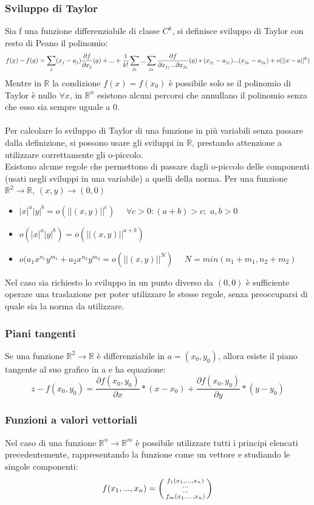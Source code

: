 \documentclass{article}
\newcommand\ubar[1]{\stackunder[1.2pt]{$#1$}{\rule{.8ex}{.075ex}}}
\newcommand{\R}{\mathds{R}}
\begin{document}
\subsubsection{Sviluppo di Taylor}
Sia f una funzione differenziabile di classe $C^k$, si definisce sviluppo di Taylor con resto di Peano il polinomio:
$$f(\ubar{x})-f(\ubar{a})=\sum_j(x_j-a_j)\frac{\partial f}{\partial x_j}(\ubar{a})+...+ \frac{1}{k!}\sum_{j_1}...\sum_{j_k}\frac{\partial f}{\partial x_{j_1}...\partial x_{j_k}}(\ubar{a})*(x_{j_1}-a_{j_1})...(x_{j_k}-a_{j_k})\\+o(||x-a||^k)$$
Mentre in $\R$ la condizione $f(x)=f(x_0)$ è possibile solo se il polinomio di Taylor è nullo $\forall x$, in $\R^n$ esistono alcuni percorsi che annullano il polinomio senza che esso sia sempre uguale a 0.\\\\
Per calcolare lo sviluppo di Taylor di una funzione in più variabili senza passare dalla definizione, si possono usare gli sviluppi in $\R$, prestando attenzione a utilizzare correttamente gli o-piccolo.\\
Esistono alcune regole che permettono di passare dagli o-piccolo delle componenti (usati negli sviluppi in una variabile) a quelli della norma. Per una funzione $\R^2\rightarrow\R$, $(x,y)\rightarrow(0,0)$
\begin{itemize}
    \item $|x|^a|y|^b=o(||(x,y)||^c)$ $\quad \forall c>0: (a+b)>c;$ $a,b>0$
    \item $o(|x|^a|y|^b)=o(||(x,y)||^{a+b})$
    \item $o(a_1x^{n_1}y^{m_1}+a_2x^{n_2}y^{m_2}=o(||(x,y)||^N)$ $\quad N=min(n_1+m_1,n_2+m_2)$
\end{itemize}
Nel caso sia richiesto lo sviluppo in un punto diverso da $(0,0)$ è sufficiente operare una traslazione per poter utilizzare le stesse regole, senza preoccuparsi di quale sia la norma da utilizzare.


\subsubsection{Piani tangenti}
Se una funzione $\R^2\rightarrow\R$ è differenziabile in $a=(x_0,y_0)$, allora esiste il piano tangente al suo grafico in a e ha equazione:
$$ z-f(x_0,y_0)=\frac{\partial f(x_0,y_0)}{\partial x}*(x-x_0)+\frac{\partial f(x_0,y_0)}{\partial y}*(y-y_0) $$


\subsubsection{Funzioni a valori vettoriali}
Nel caso di una funzione $\R^n\rightarrow\R^m$ è possibile utilizzare tutti i principi elencati precedentemente, rappresentando la funzione come un vettore e studiando le singole componenti:
$$ f(x_1,...,x_n)=\begin{psmallmatrix} f_1(x_1,...,x_n)\\...\\...\\f_m(x_1,...,x_n) \end{psmallmatrix} $$
\end{document}
